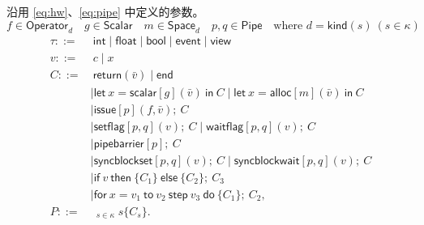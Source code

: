 \documentclass[UTF8,a4paper,11pt,fontset=fandol]{ctexart}
\newcommand{\kw}[1]{\ensuremath{\mathsf{#1}}}
\begin{document}
沿用 \eqref{eq:hw}、\eqref{eq:pipe} 中定义的参数。
\[f\in\mathsf{Operator}_d
\quad g\in\mathsf{Scalar}
\quad m\in\mathsf{Space}_d
\quad p,q\in\mathsf{Pipe}
\quad \text{where } d = \mathsf{kind}(s)\ (s \in \kappa)
\]
\[
\begin{aligned}
\tau ::={}
  &\ \mathsf{int}\mid\mathsf{float}\mid\mathsf{bool}\mid\mathsf{event}\mid\mathsf{view}\\
v ::={}
  &\ c\mid x\\
C ::={}
  &\ \kw{return}(\bar v)
   \mid \kw{end}\\
  &\mid \kw{let}\ x=\kw{scalar}[g](\bar v)\ \kw{in}\ C
   \mid \kw{let}\ x=\kw{alloc}[m](\bar v)\ \kw{in}\ C\\
  &\mid \kw{issue}[p](f,\bar v);\ C\\
  &\mid \kw{setflag}[p,q](v);\ C
   \mid \kw{waitflag}[p,q](v);\ C\\
  &\mid \kw{pipebarrier}[p];\ C\\
  &\mid \kw{syncblockset}[p,q](v);\ C
   \mid \kw{syncblockwait}[p,q](v);\ C\\
  &\mid \kw{if}\ v\ \kw{then}\ \{C_1\}\ \kw{else}\ \{C_2\};\ C_3\\
  &\mid \kw{for}\ x=v_1\ \kw{to}\ v_2\ \kw{step}\ v_3\ \kw{do}\ \{C_1\};\ C_2,\\[0.3em]
P ::={}
  &\ \mathop{\Big\|}_{s\in\kappa} s\{C_s\}.
\end{aligned}
\]
\end{document}
